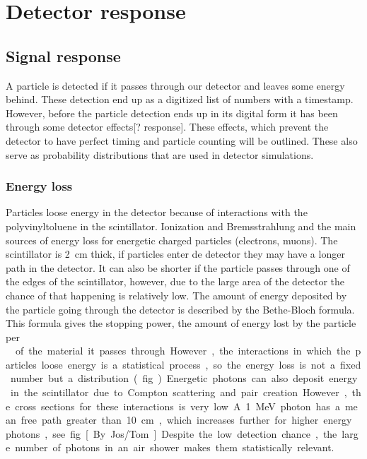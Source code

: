 \chapter{Detector response}

\section{Signal response}

A particle is detected if it passes through our detector and leaves some
energy behind. These detection end up as a digitized list of numbers
with a timestamp. However, before the particle detection ends up in its
digital form it has been through some detector effects[? response].
These effects, which prevent the detector to have perfect timing and
particle counting will be outlined. These also serve as probability
distributions that are used in detector simulations.


\subsection{Energy loss}

Particles loose energy in the detector because of interactions with the
polyvinyltoluene in the scintillator. Ionization and Bremsstrahlung and
the main sources of energy loss for energetic charged particles
(electrons, muons). The scintillator is \SI{2}{\centi\meter} thick, if
particles enter de detector they may have a longer path in the detector.
It can also be shorter if the particle passes through one of the edges
of the scintillator, however, due to the large area of the detector the
chance of that happening is relatively low. The amount of energy
deposited by the particle going through the detector is described by the
Bethe-Bloch formula. This formula gives the stopping power, the amount
of energy lost by the particle per \SI{}{\gram\centi\meter\square} of
the material it passes through. However, the interactions in which the
particles loose energy is a statistical process, so the energy loss is
not a fixed number but a distribution. (fig...)

Energetic photons can also deposit energy in the scintillator due to
Compton scattering and pair creation. However, the cross sections for
these interactions is very low. A \SI{1}{\mega\electronvolt} photon  has
a mean free path greater than \SI{10}{\centi\meter}, which increases
further for higher energy photons, see fig [By Jos/Tom]. Despite the low
detection chance, the large number of photons in an air shower makes
them statistically relevant.


